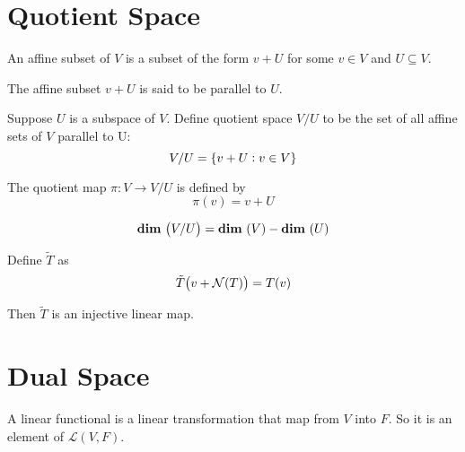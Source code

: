 %
%
%
%
\section{Quotient Space}

\begin{definition}
    An affine subset of $V$ is a subset of the form $v + U$ for some $v\in V$ and $U \subseteq V$.
    
    The affine subset $v+U$ is said to be parallel to $U$.
\end{definition}

\begin{definition}
    Suppose $U$ is a subspace of $V$. Define quotient space $V/U$ to be the set of all affine sets of $V$ parallel to U:
    \begin{equation}
        V/U = \set{v + U: v \in V}
    \end{equation}
\end{definition}

\begin{definition}
    The quotient map $\pi : V \rightarrow V/U$ is defined by 
    \begin{equation}
        \pi(v) = v + U
    \end{equation}
\end{definition}

\begin{theorem}
    \begin{equation}
        \dimension{V/U} = \dimension{V} - \dimension{U}
    \end{equation}    
\end{theorem}

\begin{theorem}
    Define $\tilde{T}$ as 
    \begin{equation}
        \tilde{T}\mleft(v + \nullspace{T}\mright) = T(v)
    \end{equation}
    
    Then $\tilde{T}$ is an injective linear map.
\end{theorem}




%
%
%
%

\section{Dual Space}

\begin{definition}\label{linear_functional}
	A linear functional is a linear transformation that map from $V$ into $F$. So it is an element of $\mathcal{L}(V, F)$.
\end{definition}


